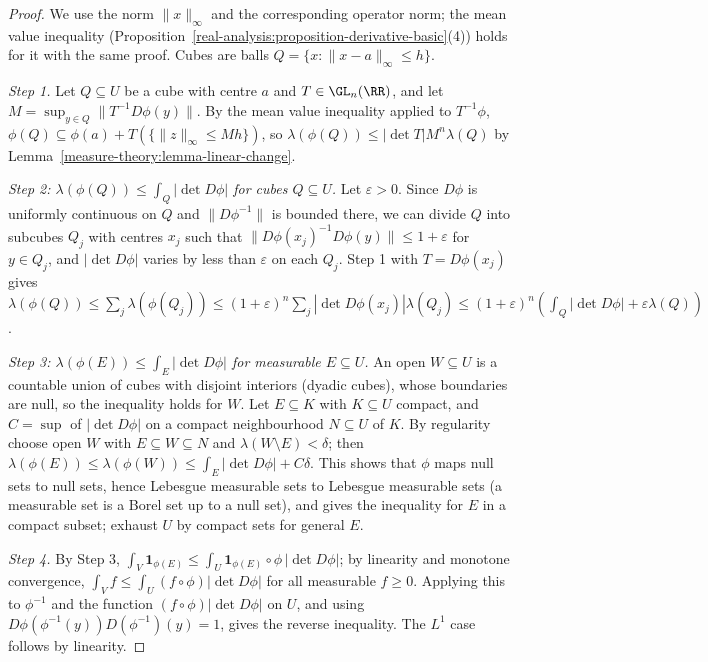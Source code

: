 \begin{proof}
We use the norm $\|x\|_\infty$ and the corresponding operator norm; the mean value inequality (Proposition~\ref{real-analysis:proposition-derivative-basic}(4)) holds for it with the same proof. Cubes are balls
$Q = \{x : \|x - a\|_\infty \leq h\}$.

\emph{Step 1.} Let $Q \subseteq U$ be a cube with centre $a$ and $T \in \GL_n(\RR)$, and let $M = \sup_{y \in Q}\|T^{-1}D\phi(y)\|$. By the mean value inequality applied to $T^{-1}\phi$,
$\phi(Q) \subseteq \phi(a) + T(\{\|z\|_\infty \leq Mh\})$, so $\lambda(\phi(Q)) \leq |\det T|M^n\lambda(Q)$ by Lemma~\ref{measure-theory:lemma-linear-change}.

\emph{Step 2: $\lambda(\phi(Q)) \leq \int_Q|\det D\phi|$ for cubes $Q \subseteq U$.} Let $\varepsilon > 0$. Since $D\phi$ is uniformly continuous on $Q$ and $\|D\phi^{-1}\|$ is bounded there, we can divide $Q$ into
subcubes $Q_j$ with centres $x_j$ such that $\|D\phi(x_j)^{-1}D\phi(y)\| \leq 1 + \varepsilon$ for $y \in Q_j$, and $|\det D\phi|$ varies by less than $\varepsilon$ on each $Q_j$. Step 1 with $T = D\phi(x_j)$ gives
$\lambda(\phi(Q)) \leq \sum_j\lambda(\phi(Q_j)) \leq (1 + \varepsilon)^n\sum_j|\det D\phi(x_j)|\lambda(Q_j) \leq (1 + \varepsilon)^n(\int_Q|\det D\phi| + \varepsilon\lambda(Q))$.

\emph{Step 3: $\lambda(\phi(E)) \leq \int_E|\det D\phi|$ for measurable $E \subseteq U$.} An open $W \subseteq U$ is a countable union of cubes with disjoint interiors (dyadic cubes), whose boundaries are null, so the
inequality holds for $W$. Let $E \subseteq K$ with $K \subseteq U$ compact, and $C = \sup$ of $|\det D\phi|$ on a compact neighbourhood $N \subseteq U$ of $K$. By regularity choose open $W$ with $E \subseteq W \subseteq N$ and
$\lambda(W \setminus E) < \delta$; then $\lambda(\phi(E)) \leq \lambda(\phi(W)) \leq \int_E|\det D\phi| + C\delta$. This shows that $\phi$ maps null sets to null sets, hence Lebesgue measurable sets to
Lebesgue measurable sets (a measurable set is a Borel set up to a null set), and gives the inequality for $E$ in a compact subset; exhaust $U$ by compact sets for general $E$.

\emph{Step 4.} By Step 3, $\int_V\mathbf{1}_{\phi(E)} \leq \int_U\mathbf{1}_{\phi(E)} \circ \phi\,|\det D\phi|$; by linearity and monotone convergence, $\int_Vf \leq \int_U(f \circ \phi)|\det D\phi|$ for all measurable
$f \geq 0$. Applying this to $\phi^{-1}$ and the function $(f \circ \phi)|\det D\phi|$ on $U$, and using $D\phi(\phi^{-1}(y))D(\phi^{-1})(y) = 1$, gives the reverse inequality. The $L^1$ case follows by linearity.
\end{proof}

